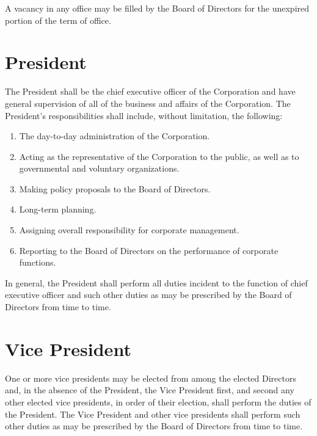 A vacancy in any office may be filled by the Board of Directors for the
unexpired portion of the term of office.

\section{President}

The President shall be the chief executive officer of the Corporation and have
general supervision of all of the business and affairs of the Corporation. The
President's responsibilities shall include, without limitation, the following:

\begin{enumerate}

    \item The day-to-day administration of the Corporation.

    \item Acting as the representative of the Corporation to the public, as
        well as to governmental and voluntary organizations.

    \item Making policy proposals to the Board of Directors.

    \item Long-term planning.

    \item Assigning overall responsibility for corporate management.

    \item Reporting to the Board of Directors on the performance of corporate
        functions.

\end{enumerate}

In general, the President shall perform all duties incident to the function of
chief executive officer and such other duties as may be prescribed by the Board
of Directors from time to time.

\section{Vice President}

One or more vice presidents may be elected from among the elected Directors
and, in the absence of the President, the Vice President first, and second any
other elected vice presidents, in order of their election, shall perform the
duties of the President. The Vice President and other vice presidents shall
perform such other duties as may be prescribed by the Board of Directors from
time to time.

